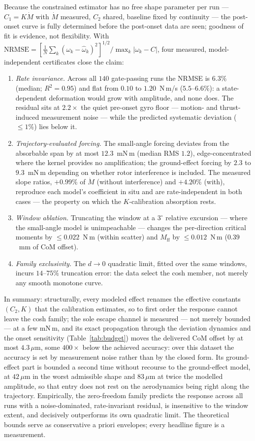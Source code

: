 Because the constrained estimator has no free shape parameter per run
— $C_1 = K\dot M$ with $\dot M$ measured, $C_2$ shared, baseline fixed
by continuity — the post-onset curve is fully determined before the
post-onset data are seen; goodness of fit is evidence, not
flexibility. With
$\mathrm{NRMSE} = [\tfrac1N\sum_k(\omega_k-\hat\omega_k)^2]^{1/2}
/ \max_k|\omega_k - C|$, four measured, model-independent certificates
close the claim:
\begin{enumerate}
\item \emph{Rate invariance.} Across all $140$ gate-passing runs the
NRMSE is $6.3\%$ (median; $R^2=0.95$) and flat from $0.10$ to
$1.20$~N\,m/s ($5.5$–$6.6\%$): a state-dependent deformation would
grow with amplitude, and none does. The residual sits at $2.2\times$
the quiet pre-onset gyro floor — motion- and thrust-induced
measurement noise — while the predicted systematic deviation
($\le 1\%$) lies below it.
\item \emph{Trajectory-evaluated forcing.} The small-angle forcing
deviates from the absorbable span by at most $12.3$~mN\,m (median RMS
$1.2$), edge-concentrated where the kernel provides no amplification;
the ground-effect forcing by $2.3$ to $9.3$~mN\,m depending on
whether rotor interference is included. The measured slope ratios,
$+0.99\%$ of $\dot M$ (without interference) and $+4.20\%$ (with),
reproduce each model's coefficient in situ and are rate-independent in
both cases —
the property on which the $K$-calibration absorption rests.
\item \emph{Window ablation.} Truncating the window at a $3^\circ$
relative excursion — where the small-angle model is unimpeachable —
changes the per-direction critical moments by $\le 0.022$~N\,m
(within scatter) and $M_{\mathrm{ff}}$ by $\le 0.012$~N\,m
($0.39$~mm of CoM offset).
\item \emph{Family exclusivity.} The $d\!\to\!0$ quadratic limit,
fitted over the same windows, incurs $14$–$75\%$ truncation error:
the data select the cosh member, not merely any smooth monotone curve.
\end{enumerate}

\noindent
In summary: structurally, every modeled effect renames the effective
constants $(C_2,K)$ that the calibration estimates, so to first order
the response cannot leave the cosh family; the sole escape channel is
measured — not merely bounded — at a few mN\,m, and its exact
propagation through the deviation dynamics and the onset sensitivity
(Table~\ref{tab:budget}) moves the delivered CoM offset by at most
$4.3\,\mu$m, some $400\times$ below the achieved accuracy: over this
dataset the accuracy is set by measurement noise rather than by the
closed form. Its ground-effect part is bounded a second time without
recourse to the ground-effect model, at $42\,\mu$m in the worst
admissible shape and $83\,\mu$m at twice the modelled amplitude, so
that entry does not rest on the aerodynamics being right along the
trajectory. Empirically, the zero-freedom
family predicts the response across all runs with a noise-dominated,
rate-invariant residual, is insensitive to the window extent, and
decisively outperforms its own quadratic limit. The theoretical bounds
serve as conservative a priori envelopes; every headline figure is a
measurement.
